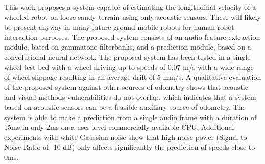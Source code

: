This work proposes a system capable of estimating the longitudinal velocity of
a wheeled robot on loose sandy terrain using only acoustic sensors. These will
likely be present anyway in many future ground mobile robots for human-robot
interaction purposes. The proposed system consists of an audio feature
extraction module, based on gammatone filterbanks, and a prediction module,
based on a convolutional neural network. The proposed system has been tested in
a single wheel test bed with a wheel driving up to speeds of 0.07 m/s with a
wide range of wheel slippage resulting in an average drift of 5 mm/s. A
qualitative evaluation of the proposed system against other sources of odometry
shows that acoustic and visual methods vulnerabilities do not overlap, which
indicates that a system based on acoustic sensors can be a feasible auxiliary
source of odometry. The system is able to make a prediction from a single audio
frame with a duration of 15ms in only 2ms on a user-level commercially
available CPU. Additional experiments with white Gaussian noise show that high
noise power (Signal to Noise Ratio of -10 dB) only affects significantly the
prediction of speeds close to 0ms.